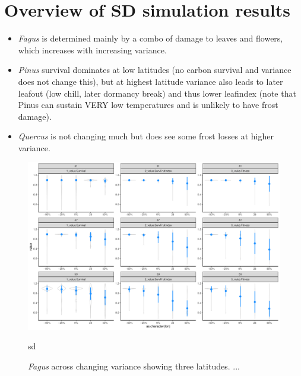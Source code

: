 \documentclass[11pt,letter]{article}
\begin{document}
\newpage
\section{Overview of SD simulation results}

\begin{itemize}
\item \emph{Fagus} is determined mainly by a combo of damage to leaves and flowers, which increases with increasing variance. 
\item \emph{Pinus} survival dominates at low latitudes (no carbon survival and variance does not change this), but at highest latitude variance also leads to later leafout (low chill, later dormancy break) and thus lower leafindex (note that Pinus can sustain VERY low temperatures and is unlikely to have frost damage). 
\item \emph{Quercus} is not changing much but does see some frost losses at higher variance.
\end{itemize}


\begin{figure} 
 \begin{center}
\noindent \includegraphics[width=1\textwidth]{..//analyses/graphs/phenofit/sims/metrics3/sdsim_3metricsFS.pdf}
  \caption{\emph{Fagus} across changing variance showing three latitudes. ...}
  \label{fig:fagussd3}sd
  \end{center}
\end{figure}
\end{document}
